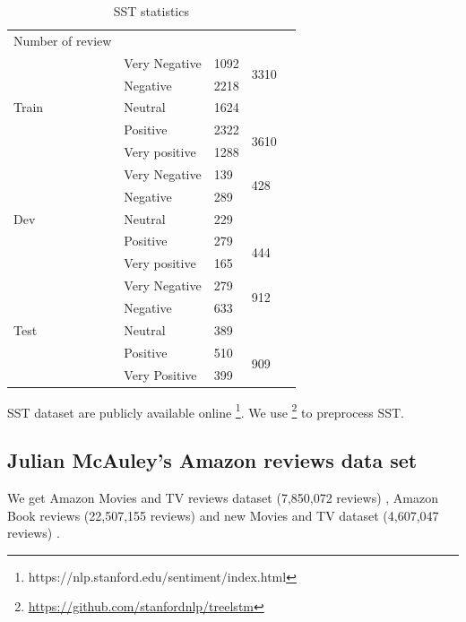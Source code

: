 \begin{table}[H]
	\centering
	\caption{SST statistics}
	\label{table:sststatistic}
	\begin{tabular}{lllll}
		Number of review       &               &      &                       &  \\ \cline{1-4}
		\multirow{5}{*}{Train} & Very Negative & 1092 & \multirow{2}{*}{3310} &  \\ \cline{2-3}
		& Negative      & 2218 &                       &  \\ \cline{2-4}
		& Neutral       & 1624 &                       &  \\ \cline{2-4}
		& Positive      & 2322 & \multirow{2}{*}{3610} &  \\ \cline{2-3}
		& Very positive & 1288 &                       &  \\ \cline{1-4}
		\multirow{5}{*}{Dev}   & Very Negative & 139  & \multirow{2}{*}{428}  &  \\ \cline{2-3}
		& Negative      & 289  &                       &  \\ \cline{2-4}
		& Neutral       & 229  &                       &  \\ \cline{2-4}
		& Positive      & 279  & \multirow{2}{*}{444}  &  \\ \cline{2-3}
		& Very positive & 165  &                       &  \\ \cline{1-4}
		\multirow{5}{*}{Test}  & Very Negative & 279  & \multirow{2}{*}{912}  &  \\ \cline{2-3}
		& Negative      & 633  &                       &  \\ \cline{2-4}
		& Neutral       & 389  &                       &  \\ \cline{2-4}
		& Positive      & 510  & \multirow{2}{*}{909}  &  \\ \cline{2-3}
		& Very Positive & 399  &                       &  \\ \cline{2-4}
	\end{tabular}
\end{table}


SST dataset are publicly available online \footnote{https://nlp.stanford.edu/sentiment/index.html}. We use
\footnote{\url{https://github.com/stanfordnlp/treelstm}} to preprocess SST.

\subsection{Julian McAuley's Amazon reviews data set}\label{sec:amazon}
We get Amazon Movies and TV reviews dataset (7,850,072 reviews) \cite{mcauley2013hidden}, Amazon Book reviews (22,507,155 reviews) and new Movies and TV dataset (4,607,047 reviews) \cite{he2016ups}. 

